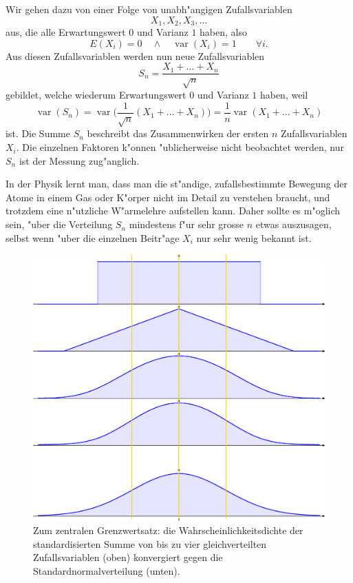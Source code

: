 Wir gehen dazu von einer Folge von unabh"angigen Zufallsvariablen
\[
X_1,X_2,X_3,\dots
\]
aus, die alle Erwartungswert $0$ und Varianz $1$ haben, also
\[
E(X_i)=0\quad\wedge\quad\operatorname{var}(X_i)=1\qquad\forall i.
\]
Aus diesen Zufallsvariablen werden nun neue Zufallsvariablen
\[
S_n=\frac{X_1+\dots+X_n}{\sqrt{n}}
\]
gebildet, welche wiederum Erwartungswert $0$ und Varianz $1$ haben,
weil
\[
\operatorname{var}(S_n)=\operatorname{var}\bigl(\frac1{\sqrt{n}}(X_1+\dots+X_n)\big)
=\frac1n\operatorname{var}(X_1+\dots+X_n)
\]
ist.
Die Summe $S_n$ beschreibt das Zusammenwirken der ersten $n$
Zufallsvariablen $X_i$.
Die einzelnen Faktoren k"onnen "ublicherweise
nicht beobachtet werden, nur $S_n$ ist der Messung zug"anglich.

In der Physik lernt man, dass man die st"andige, zufallsbestimmte
Bewegung der Atome in einem Gas oder K"orper nicht im Detail
zu verstehen braucht, und trotzdem eine n"utzliche W"armelehre
aufstellen kann.
Daher sollte es m"oglich sein, "uber die Verteilung
$S_n$ mindestens f"ur sehr grosse $n$ etwas auszusagen, selbst
wenn "uber die einzelnen Beitr"age $X_i$ nur sehr wenig bekannt ist.
\begin{figure}
\begin{center}
\includegraphics[width=\hsize]{images/verteilungsfunktion-10}
\end{center}
\caption{Zum zentralen Grenzwertsatz: die Wahrscheinlichkeitsdichte
der standardisierten Summe von bis zu vier 
gleichverteilten Zufallsvariablen (oben)
konvergiert gegen die Standardnormalverteilung (unten).\label{zgws}}
\end{figure}

